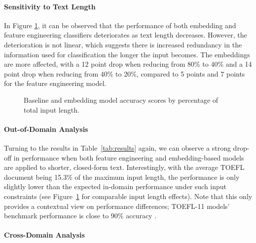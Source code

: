 \documentclass[10pt, a4paper]{article}
\begin{document}
\paragraph{Sensitivity to Text Length} In Figure \ref{fig:text_length}, it can be observed that the performance of both embedding and feature engineering classifiers deteriorates as text length decreases. However, the deterioration is not linear, which suggests there is increased redundancy in the information used for classification the longer the input becomes. The embeddings are more affected, with a 12 point drop when reducing from 80\% to 40\% and a 14 point drop when reducing from 40\% to 20\%, compared to 5 points and 7 points for the feature engineering model.

\begin{figure}[t]
    \centering
    
    \caption{Baseline and embedding model accuracy scores by percentage of total input length.}
    \label{fig:text_length}
\end{figure}

\paragraph{Out-of-Domain Analysis} Turning to the results in Table~\ref{tab:results} again, we can observe a strong drop-off in performance when both feature engineering and embedding-based models are applied to shorter, closed-form text. Interestingly, with the average TOEFL document being 15.3\% of the maximum input length, the performance is only slightly lower than the expected in-domain performance under such input constraints (see Figure~\ref{fig:text_length} for comparable input length effects). Note that this only provides a contextual view on performance differences; TOEFL-11 models'  benchmark performance is close to 90\% accuracy \cite{DBLP:conf/bea/MalmasiECTPHNQ17}.

\paragraph{Cross-Domain Analysis}
\end{document}
